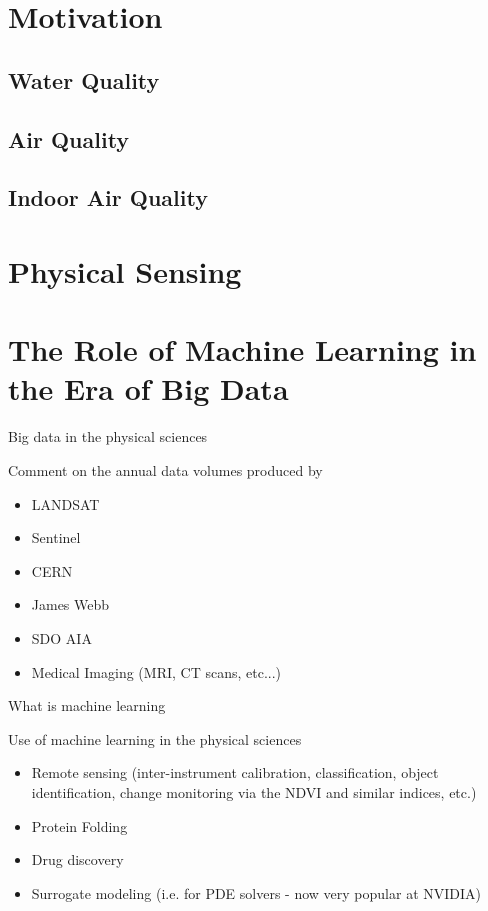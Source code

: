 \section{Motivation}

\subsection{Water Quality}
\subsection{Air Quality}
\subsection{Indoor Air Quality}

\section{Physical Sensing}

\section{The Role of Machine Learning in the Era of Big Data}

Big data in the physical sciences

Comment on the annual data volumes produced by
\begin{itemize}
  \item LANDSAT
  \item Sentinel
  \item CERN
  \item James Webb
  \item SDO AIA
  \item Medical Imaging (MRI, CT scans, etc...)
\end{itemize}

What is machine learning

Use of machine learning in the physical sciences

\begin{itemize}
  \item Remote sensing (inter-instrument calibration, classification, object identification, change monitoring via the NDVI and similar indices, etc.)
  \item Protein Folding
  \item Drug discovery
  \item Surrogate modeling (i.e. for PDE solvers - now very popular at NVIDIA)
\end{itemize}




